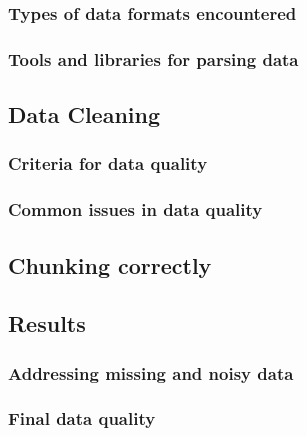 \subsubsection{Types of data formats encountered}
\subsubsection{Tools and libraries for parsing data}

\subsection{Data Cleaning}
\subsubsection{Criteria for data quality}
\subsubsection{Common issues in data quality}

\subsection{Chunking correctly}

\subsection{Results}
\subsubsection{Addressing missing and noisy data}
\subsubsection{Final data quality}